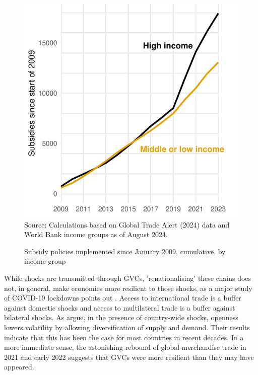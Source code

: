 \documentclass{article}
\begin{document}
\begin{figure}
    \caption{Subsidy policies implemented since January 2009, cumulative, by income group}
    \label{fig:subsidies}
    \centering
    \begin{minipage}{0.6\linewidth}
        \includegraphics[width = \linewidth]{subsidies.pdf}
        \\
        \small{Source: Calculations based on Global Trade Alert (2024) data and World Bank income groups as of August 2024.}
    \end{minipage}
\end{figure}

While shocks are transmitted through GVCs, 'renationalising' these chains does not, in general, make economies more resilient to those shocks, as a major study of COVID-19 lockdowns points out \parencite{bonadio_global_2021}. Access to international trade is a buffer against domestic shocks and access to multilateral trade is a buffer against bilateral shocks. As \textcite{caselli_diversification_2020} argue, in the presence of country-wide shocks, openness lowers volatility by allowing diversification of supply and demand. Their results indicate that this has been the case for most countries in recent decades. In a more immediate sense, the astonishing rebound of global merchandise trade in 2021 and early 2022 suggests that GVCs were more resilient than they may have appeared.
\end{document}
